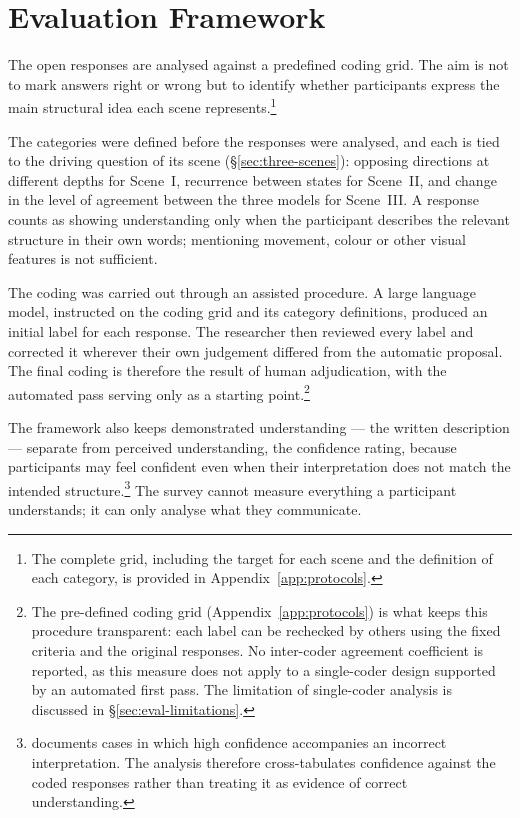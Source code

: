 \section{Evaluation Framework}
\label{sec:eval-framework}

The open responses are analysed against a predefined coding grid. The aim is not to mark answers right or wrong but to identify whether participants express the main structural idea each scene represents.\footnote{The complete grid, including the target for each scene and the definition of each category, is provided in Appendix~\ref{app:protocols}.}

The categories were defined before the responses were analysed, and each is tied to the driving question of its scene (\S\ref{sec:three-scenes}): opposing directions at different depths for Scene~I, recurrence between states for Scene~II, and change in the level of agreement between the three models for Scene~III. A response counts as showing understanding only when the participant describes the relevant structure in their own words; mentioning movement, colour or other visual features is not sufficient.

The coding was carried out through an assisted procedure. A large language model, instructed on the coding grid and its category definitions, produced an initial label for each response. The researcher then reviewed every label and corrected it wherever their own judgement differed from the automatic proposal. The final coding is therefore the result of human adjudication, with the automated pass serving only as a starting point.\footnote{The pre-defined coding grid (Appendix~\ref{app:protocols}) is what keeps this procedure transparent: each label can be rechecked by others using the fixed criteria and the original responses. No inter-coder agreement coefficient is reported, as this measure does not apply to a single-coder design supported by an automated first pass. The limitation of single-coder analysis is discussed in \S\ref{sec:eval-limitations}.}

The framework also keeps demonstrated understanding --- the written description --- separate from perceived understanding, the confidence rating, because participants may feel confident even when their interpretation does not match the intended structure.\footnote{\textcite{fischer2020} documents cases in which high confidence accompanies an incorrect interpretation. The analysis therefore cross-tabulates confidence against the coded responses rather than treating it as evidence of correct understanding.} The survey cannot measure everything a participant understands; it can only analyse what they communicate.

